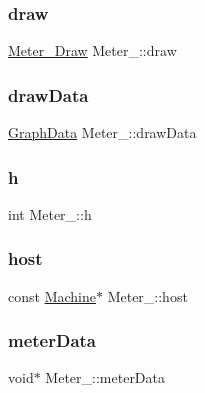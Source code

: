 \subsubsection{\texorpdfstring{draw}{draw}}
{\footnotesize\ttfamily \hyperlink{Meter_8h_af2bfba1e0c54d7d0dc0511e1805b1725}{Meter\+\_\+\+Draw} Meter\+\_\+\+::draw}

\mbox{\label{structMeter___a7f9022ce2c1a382a06a000dd9ea8896c}} 
\subsubsection{\texorpdfstring{draw\+Data}{drawData}}
{\footnotesize\ttfamily \hyperlink{Meter_8h_ab34ea7cb1d5864cd6f66f8de77662147}{Graph\+Data} Meter\+\_\+\+::draw\+Data}

\mbox{\label{structMeter___abbadc9c9277bb3f684638311b4a641fb}} 
\subsubsection{\texorpdfstring{h}{h}}
{\footnotesize\ttfamily int Meter\+\_\+\+::h}

\mbox{\label{structMeter___aa827fa608e9c10bee5f8db4cd74a2d52}} 
\subsubsection{\texorpdfstring{host}{host}}
{\footnotesize\ttfamily const \hyperlink{Machine_8h_aa3706f95e4706b9d02979efcabb1341d}{Machine}$\ast$ Meter\+\_\+\+::host}

\mbox{\label{structMeter___ac5fab91567c4a20ba7d9db35804bb4d8}} 
\subsubsection{\texorpdfstring{meter\+Data}{meterData}}
{\footnotesize\ttfamily void$\ast$ Meter\+\_\+\+::meter\+Data}

